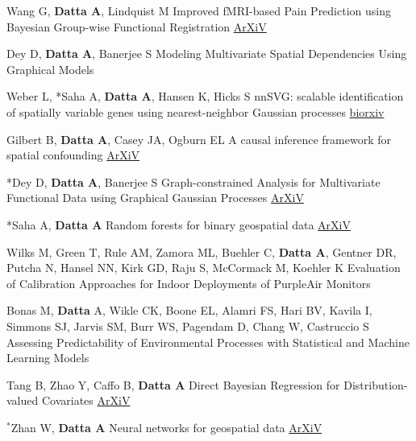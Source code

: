 \documentclass[12pt]{article}
\newcommand{\mine}{
  \addtocounter{enumi}{1}
\item[\fcolorbox{white}{grey}{\color{white} \tiny \arabic{enumi}}]
}
\begin{document}

\item Wang G, \textbf{Datta A}, Lindquist M {Improved fMRI-based Pain Prediction using Bayesian Group-wise Functional Registration}
 \href{https://arxiv.org/abs/2209.07585}{ArXiV}

\item *Dey D, \textbf{Datta A}, Banerjee S {Modeling Multivariate Spatial Dependencies Using Graphical Models}

\item Weber L, *Saha A, \textbf{Datta A}, Hansen K, Hicks S {nnSVG: scalable identification of spatially variable genes using nearest-neighbor Gaussian processes} \href{https://www.biorxiv.org/content/10.1101/2022.05.16.492124v1}{biorxiv}

\item *Gilbert B, \textbf{Datta A}, Casey JA, Ogburn EL {A causal inference framework for spatial confounding} \href{https://arxiv.org/abs/2112.14946}{ArXiV}

\mine *Dey D, \textbf{Datta A}, Banerjee S {Graph-constrained Analysis for Multivariate Functional Data using Graphical Gaussian Processes} \href{https://arxiv.org/abs/2209.06294}{ArXiV}

\mine *Saha A, \textbf{Datta A} {Random forests for binary geospatial data} \href{https://arxiv.org/abs/2302.13828}{ArXiV}

\item Wilks M, Green T, Rule AM, Zamora ML, Buehler C, \textbf{Datta A}, Gentner DR, Putcha N, Hansel NN, Kirk GD, Raju S, McCormack M, Koehler K Evaluation of Calibration Approaches for Indoor Deployments of PurpleAir Monitors

\item Bonas M, \textbf{Datta} A, Wikle CK, Boone EL, Alamri FS,
Hari BV, Kavila I, Simmons SJ, Jarvis SM, Burr WS, Pagendam D, Chang W, Castruccio S Assessing Predictability of Environmental Processes with Statistical and Machine Learning Models

\mine Tang B, Zhao Y, Caffo B, \textbf{Datta A} Direct Bayesian Regression for Distribution-valued Covariates \href{https://arxiv.org/abs/2303.06434}{ArXiV}

\mine $^*$Zhan W, \textbf{Datta A} {Neural networks for geospatial data} \href{https://arxiv.org/abs/2304.09157}{ArXiV}
\end{document}
